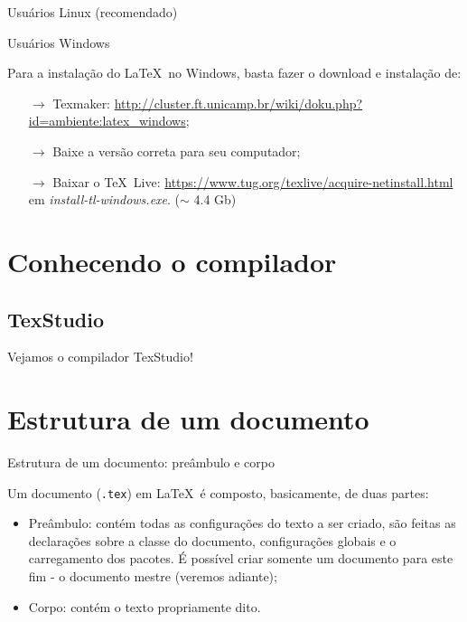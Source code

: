 \documentclass[c]{beamer}
\begin{document}
{\begin{frame}[fragile]{\sc Usuários Linux (recomendado)}
    \end{frame}
    
    \begin{frame}[fragile]{\sc Usuários Windows}
        
	    Para a instalação do \LaTeX \ no Windows, basta fazer o download e instalação de:
	    \begin{itemize}
	    \setlength\itemsep{0.3cm}
		    \item[$\to$] Texmaker: \url{http://cluster.ft.unicamp.br/wiki/doku.php?id=ambiente:latex_windows};
		    \item[$\to$] Baixe a versão correta para seu computador;
		    \item[$\to$] Baixar o \TeX \ Live: \url{https://www.tug.org/texlive/acquire-netinstall.html} em \emph{install-tl-windows.exe}. \quad ($\sim$ 4.4 Gb)
	    \end{itemize}
	    
    \end{frame}

\section{Conhecendo o compilador}
    
    \subsection{TexStudio}
        
        \begin{frame}[standout]
            
            Vejamos o compilador TexStudio!
            
        \end{frame}

\section{Estrutura de um documento}

    \begin{frame}[fragile]{\sc Estrutura de um documento: preâmbulo e corpo}
        
	    Um documento (\verb|.tex|) em \LaTeX \ é composto, basicamente, de duas partes:
	    \begin{itemize}	
	    \setlength\itemsep{0.2cm}
		    \item {\color{blue} Preâmbulo}: contém todas as configurações do texto a ser criado, são feitas as declarações sobre a {\color{blue} classe} do documento, {\color{blue} configurações globais} e o carregamento dos {\color{blue} pacotes}. É possível criar somente um documento para este fim - o {\color{blue} documento mestre} (veremos adiante);
            \item {\color{blue} Corpo}: contém o texto propriamente dito.
	    \end{itemize}
	    

\end{frame}}
\end{document}
